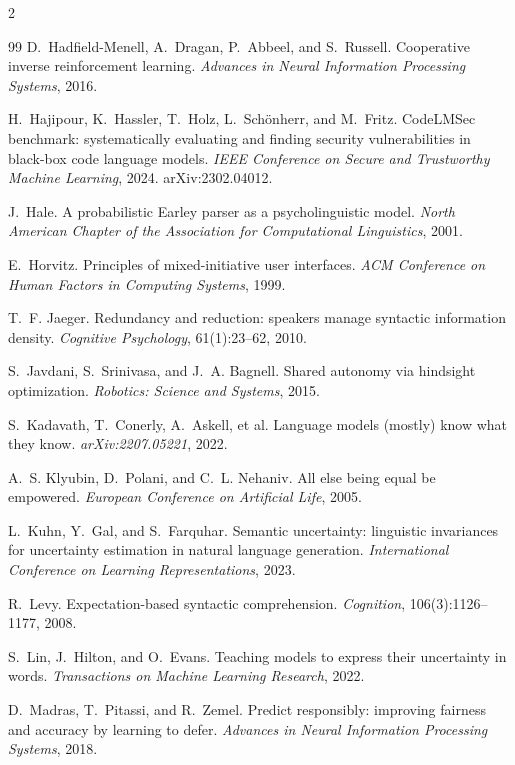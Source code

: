\documentclass[10pt]{article}
\begin{document}
\begin{multicols}{2}
\begin{thebibliography}{99}
D.~Hadfield-Menell, A.~Dragan, P.~Abbeel, and S.~Russell.
Cooperative inverse reinforcement learning.
\emph{Advances in Neural Information Processing Systems}, 2016.

H.~Hajipour, K.~Hassler, T.~Holz, L.~Schönherr, and M.~Fritz.
CodeLMSec benchmark: systematically evaluating and finding security vulnerabilities in black-box
code language models.
\emph{IEEE Conference on Secure and Trustworthy Machine Learning}, 2024. arXiv:2302.04012.

J.~Hale.
A probabilistic Earley parser as a psycholinguistic model.
\emph{North American Chapter of the Association for Computational Linguistics}, 2001.

E.~Horvitz.
Principles of mixed-initiative user interfaces.
\emph{ACM Conference on Human Factors in Computing Systems}, 1999.

T.~F. Jaeger.
Redundancy and reduction: speakers manage syntactic information density.
\emph{Cognitive Psychology}, 61(1):23--62, 2010.

S.~Javdani, S.~Srinivasa, and J.~A. Bagnell.
Shared autonomy via hindsight optimization.
\emph{Robotics: Science and Systems}, 2015.

S.~Kadavath, T.~Conerly, A.~Askell, et al.
Language models (mostly) know what they know.
\emph{arXiv:2207.05221}, 2022.

A.~S. Klyubin, D.~Polani, and C.~L. Nehaniv.
All else being equal be empowered.
\emph{European Conference on Artificial Life}, 2005.

L.~Kuhn, Y.~Gal, and S.~Farquhar.
Semantic uncertainty: linguistic invariances for uncertainty estimation in natural language
generation.
\emph{International Conference on Learning Representations}, 2023.

R.~Levy.
Expectation-based syntactic comprehension.
\emph{Cognition}, 106(3):1126--1177, 2008.

S.~Lin, J.~Hilton, and O.~Evans.
Teaching models to express their uncertainty in words.
\emph{Transactions on Machine Learning Research}, 2022.

D.~Madras, T.~Pitassi, and R.~Zemel.
Predict responsibly: improving fairness and accuracy by learning to defer.
\emph{Advances in Neural Information Processing Systems}, 2018.


\end{thebibliography}
\end{multicols}
\end{document}
